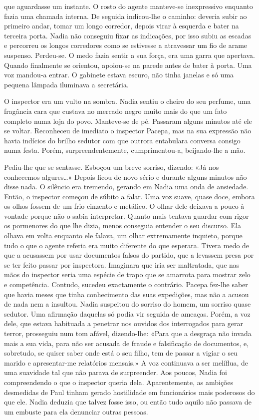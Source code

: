 que aguardasse um instante. O rosto do agente manteve-se inexpressivo
enquanto fazia uma chamada interna. De seguida indicou-lhe o caminho:
deveria subir ao primeiro andar, tomar um longo corredor, depois virar à
esquerda e bater na terceira porta. Nadia não conseguiu fixar as indicações, por isso subiu as escadas e percorreu os longos corredores como
se estivesse a atravessar um fio de arame suspenso. Perdeu-se. O medo
fazia sentir a sua força, era uma garra que apertava. Quando finalmente
se orientou, apoiou-se na parede antes de bater à porta. Uma voz
mandou-a entrar. O gabinete estava escuro, não tinha janelas e só uma
pequena lâmpada iluminava a secretária.

O inspector era um vulto na sombra. Nadia sentiu o cheiro do seu
perfume, uma fragância cara que custava no mercado negro muito mais do
que um fato completo numa loja do povo. Manteve-se de pé. Passaram
alguns minutos até ele se voltar. Reconheceu de imediato o inspector
Pacepa, mas na sua expressão não havia indícios do brilho sedutor com
que outrora entabulara conversa consigo numa festa. Porém,
surpreendentemente, cumprimentou-a, beijando-lhe a mão.

Pediu-lhe que se sentasse. Esboçou um breve sorriso, dizendo: «Já nos
conhecemos algures\ldots{}» Depois ficou de novo sério e durante alguns
minutos não disse nada. O silêncio era tremendo, gerando em Nadia uma
onda de ansiedade. Então, o inspector começou de súbito a falar. Uma voz
suave, quase doce, embora os olhos fossem de um frio cinzento e
metálico. O olhar dele deixava-a pouco à vontade porque não o sabia
interpretar. Quanto mais tentava guardar com rigor os pormenores do
que lhe dizia, menos conseguia entender o seu discurso. Ela olhava em
volta enquanto ele falava, um olhar extremamente inquieto, porque tudo o
que o agente referia era muito diferente do que esperara. Tivera medo de
que a acusassem por usar documentos falsos do partido, que a levassem
presa por se ter feito passar por inspectora. Imaginara que iria ser
maltratada, que nas mãos do inspector seria uma espécie de trapo que se
amarrota para mostrar zelo e competência. Contudo, sucedeu exactamente
o contrário. Pacepa fez-lhe saber que havia meses que tinha conhecimento das suas expedições, mas não a acusou de nada nem a insultou.
Nadia suspeitou do sorriso do homem, um sorriso quase sedutor. Uma
afirmação daquelas só podia vir seguida de ameaças. Porém, a voz dele,
que estava habituada a penetrar nos ouvidos dos interrogados para
gerar terror, prosseguiu num tom afável, dizendo-lhe: «Para que a
desgraça não invada mais a sua vida, para não ser acusada de fraude e
falsificação de documentos, e, sobretudo, se quiser saber onde está o
seu filho, tem de passar a vigiar o seu marido e apresentar-me
relatórios mensais.» A voz continuava a ser melíflua, de uma suavidade
tal que não parava de surpreender. Aos poucos, Nadia foi compreendendo
o que o inspector queria dela. Aparentemente, as ambições desmedidas de
Paul tinham gerado hostilidade em funcionários mais poderosos do que
ele. Nadia deduzia que talvez fosse isso, ou então tudo aquilo não
passava de um embuste para ela denunciar outras pessoas.

